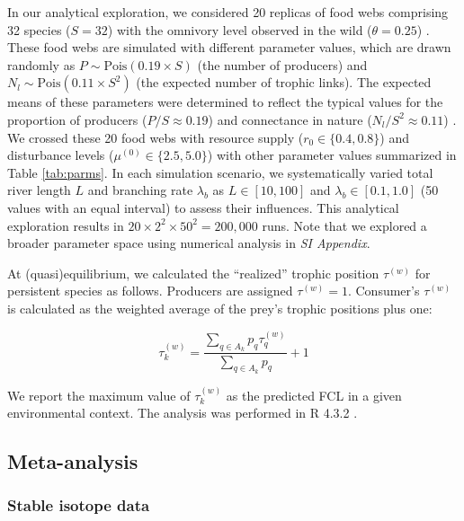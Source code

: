\documentclass[11pt, class=article, crop=false]{standalone}
\begin{document}
In our analytical exploration, we considered 20 replicas of food webs comprising 32 species ($S = 32$) with the omnivory level observed in the wild ($\theta = 0.25$) \cite{johnson_trophic_2014}.
These food webs are simulated with different parameter values, which are drawn randomly as $P \sim \mbox{Pois}(0.19 \times S)$ (the number of producers) and $N_l \sim \mbox{Pois}(0.11 \times S^2)$ (the expected number of trophic links).
The expected means of these parameters were determined to reflect the typical values for the proportion of producers ($P / S \approx 0.19$) \citep{briand_community_1984} and connectance in nature ($N_l / S^2 \approx 0.11$) \citep{dunne_food-web_2002}.
We crossed these 20 food webs with resource supply ($r_0 \in \{0.4, 0.8\}$) and disturbance levels ($\mu^{(0)} \in \{2.5, 5.0\}$) with other parameter values summarized in Table \ref{tab:parms}.
In each simulation scenario, we systematically varied total river length $L$ and branching rate $\lambda_b$ as $L \in [10, 100]$ and $\lambda_b \in [0.1, 1.0]$ (50 values with an equal interval) to assess their influences.
This analytical exploration results in $20 \times 2^2 \times 50^2 = 200,000$ runs.
Note that we explored a broader parameter space using numerical analysis in \textit{SI Appendix}.

At (quasi)equilibrium, we calculated the ``realized'' trophic position $\tau^{(w)}$ for persistent species as follows.
Producers are assigned $\tau^{(w)} = 1$.
Consumer's $\tau^{(w)}$ is calculated as the weighted average of the prey's trophic positions plus one:

\begin{equation}
    \tau^{(w)}_k = \frac{\sum_{q \in A_{k}} p_{q} \tau^{(w)}_q}{\sum_{q \in A_{k}} p_{q}} + 1
    \label{eq:def_tp}
\end{equation}

We report the maximum value of $\tau_k^{(w)}$ as the predicted FCL in a given environmental context.
The analysis was performed in R 4.3.2 \citep{r_program}.

\subsection{Meta-analysis}

\subsubsection{Stable isotope data}
\end{document}
